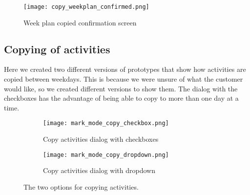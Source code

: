 \begin{figure}[H]
    \centering
    \texttt{[image: copy\_weekplan\_confirmed.png]} 
    \caption{Week plan copied confirmation screen}
    \label{fig:copy_weekplan_confirmed}
\end{figure}

\subsection{Copying of activities}
Here we created two different versions of prototypes that show how activities are copied between weekdays.
This is because we were unsure of what the customer would like, so we created different versions to show them.
The dialog with the checkboxes has the advantage of being able to copy to more than one day at a time.
\begin{figure}[H]
    \begin{subfigure}{0.5\textwidth}
    \texttt{[image: mark\_mode\_copy\_checkbox.png]} 
    \caption{Copy activities dialog with checkboxes}
    \label{fig:mark_mode_copy_checkbox}
    \end{subfigure}
    \begin{subfigure}{0.5\textwidth}
        \texttt{[image: mark\_mode\_copy\_dropdown.png]}
    \caption{Copy activities dialog with dropdown}
    \label{fig:mark_mode_copy_dropdown}
    \end{subfigure} 
    \caption{The two options for copying activities.}
    \label{fig:mark_mode_copy_dropdown_and_checkbox}
\end{figure}



